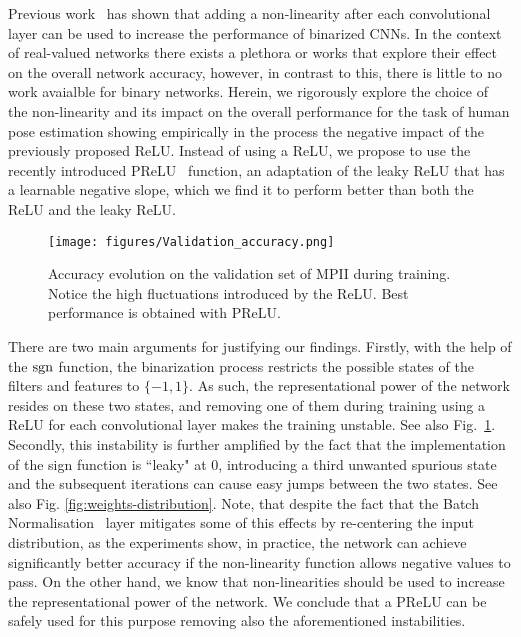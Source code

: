 \documentclass[10pt,twocolumn,letterpaper]{article}
\begin{document}
Previous work~\cite{rastegari2016xnor,bulat2017binarized} has shown that adding a non-linearity after each convolutional layer can be used to increase the  performance of binarized CNNs. In the context of real-valued networks there exists a plethora or works that explore their effect on the overall network accuracy, however, in contrast to this, there is little to no work avaialble for binary networks.  Herein, we rigorously explore the choice of the non-linearity and its impact on the overall performance for the task of human pose estimation showing empirically in the process the negative impact of the previously proposed ReLU. Instead of using a ReLU, we propose to use the recently introduced PReLU~\cite{he2015delving} function, an adaptation of the leaky ReLU that has a learnable negative slope,  which we find it to perform better than both the ReLU and the leaky ReLU. 

\begin{figure}[!htbp]
    \centering
    \texttt{[image: figures/Validation\_accuracy.png]}
    \caption{Accuracy evolution on the validation set of MPII during training. Notice the high fluctuations introduced by the ReLU. Best performance is obtained with PReLU.}
    \label{fig:validation-accuracy-main}
\end{figure}

There are two main arguments for justifying our findings. Firstly, with the help of the $\operatorname{sgn}$ function, the binarization process restricts the possible states of the filters and features to $\{-1, 1\}$. As such, the representational power of the network resides on these two states, and removing one of them during training using a ReLU for each convolutional layer makes the training unstable. See also Fig.~\ref{fig:validation-accuracy-main}. Secondly, this instability is further amplified  by the fact that the implementation of the sign function is ``leaky" at 0, introducing a third unwanted spurious state and the subsequent iterations can cause easy jumps between the two states. See also Fig. \ref{fig:weights-distribution}. Note, that despite the fact that the Batch Normalisation~\cite{ioffe2015batch} layer mitigates some of this effects by re-centering the input distribution, as the experiments show, in practice, the network can achieve significantly better accuracy if the non-linearity function allows negative values to pass. On the other hand, we know that non-linearities should be used to increase the representational power of the network. We conclude that a PReLU can be safely used for this purpose removing also the aforementioned instabilities. 
\end{document}

